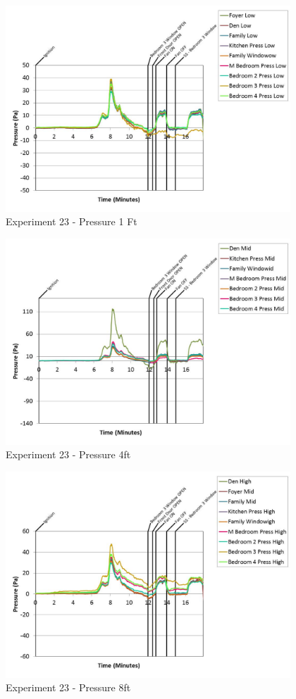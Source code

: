 \documentclass{article}
\begin{document}
\begin{appendices}
	\begin{figure}[h!]
		\centering
		\includegraphics[height=3.05in]{0_Images/Results_Charts/Exp_23_Charts/Pressure1Ft.pdf}
		\caption{Experiment 23 - Pressure 1 Ft}
	\end{figure}
 
	\clearpage

	\begin{figure}[h!]
		\centering
		\includegraphics[height=3.05in]{0_Images/Results_Charts/Exp_23_Charts/Pressure4ft.pdf}
		\caption{Experiment 23 - Pressure 4ft}
	\end{figure}
 

	\begin{figure}[h!]
		\centering
		\includegraphics[height=3.05in]{0_Images/Results_Charts/Exp_23_Charts/Pressure8ft.pdf}
		\caption{Experiment 23 - Pressure 8ft}
	\end{figure}
 

\end{appendices}
\end{document}
